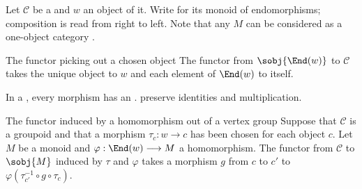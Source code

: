 Let $\mathcal C$ be a  and $w$ an
object of it.  Write  for its monoid
of endomorphisms; composition
 is read from right to
left.  Note that any  $M$ can be considered as a
one-object category .

\begin{definition}[id=3.1]{The functor picking out a chosen object}
The functor from $\sobj{\End(w)}$ to $\mathcal C$ takes the unique object to
$w$ and each element of $\End(w)$ to itself.
\end{definition}

In a , every morphism has an
.
 preserve identities and
multiplication.

\begin{definition}[id=3.2]{The functor induced by a homomorphism out of a vertex group}
Suppose that $\mathcal C$ is a groupoid and that a morphism
$\tau_c:w\longrightarrow c$ has been chosen for each object $c$.  Let $M$ be
a monoid and $\varphi:\End(w)\longrightarrow M$ a homomorphism.
The functor from $\mathcal C$ to $\sobj{M}$ induced by $\tau$ and $\varphi$
takes a morphism $g$ from $c$ to $c'$ to
$\varphi(\tau_{c'}^{-1}\circ g\circ\tau_c)$.
\end{definition}
